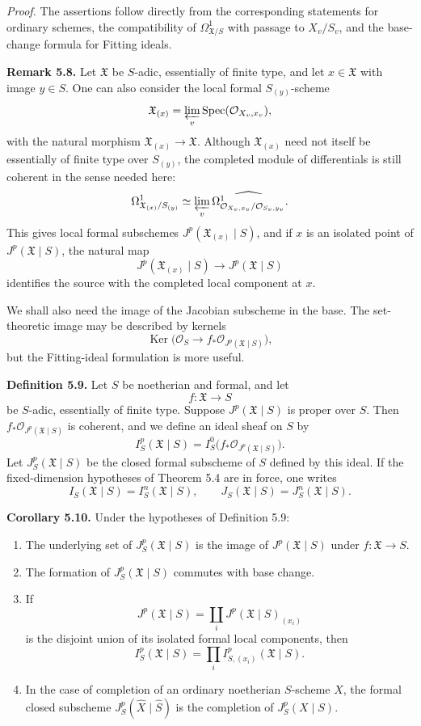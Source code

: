\documentclass[11pt]{article}
\providecommand{\Spec}{\operatorname{Spec}}
\providecommand{\Ker}{\operatorname{Ker}}
\providecommand{\Oo}{\mathcal O}
\begin{document}
\emph{Proof.}  The assertions follow directly from the corresponding statements for ordinary schemes, the compatibility of \(\Omega^1_{\mathfrak X/S}\) with passage to \(X_v/S_v\), and the base-change formula for Fitting ideals.

\textbf{Remark 5.8.}  Let \(\mathfrak X\) be \(S\)-adic, essentially of finite type, and let \(x\in\mathfrak X\) with image \(y\in S\).  One can also consider the local formal \(S_{(y)}\)-scheme
\[
        \mathfrak X_{(x)}=\varprojlim_v \Spec(\Oo_{X_v,x_v}),
\]
with the natural morphism \(\mathfrak X_{(x)}\to\mathfrak X\).  Although \(\mathfrak X_{(x)}\) need not itself be essentially of finite type over \(S_{(y)}\), the completed module of differentials is still coherent in the sense needed here:
\[
        \Omega^1_{\mathfrak X_{(x)}/S_{(y)}}
        \simeq
        \varprojlim_v \widehat{\Omega^1_{\Oo_{X_v,x_v}/\Oo_{S_v,y_v}}}.
\]
This gives local formal subschemes \(J^p(\mathfrak X_{(x)}\mid S)\), and if \(x\) is an isolated point of \(J^p(\mathfrak X\mid S)\), the natural map
\[
        J^p(\mathfrak X_{(x)}\mid S)\longrightarrow J^p(\mathfrak X\mid S)
\]
identifies the source with the completed local component at \(x\).

We shall also need the image of the Jacobian subscheme in the base.  The set-theoretic image may be described by kernels
\[
        \Ker\bigl(\Oo_S\to f_*\Oo_{J^p(\mathfrak X\mid S)}\bigr),
\]
but the Fitting-ideal formulation is more useful.

\textbf{Definition 5.9.}  Let \(S\) be noetherian and formal, and let
\[
        f:\mathfrak X\longrightarrow S
\]
be \(S\)-adic, essentially of finite type.  Suppose \(J^p(\mathfrak X\mid S)\) is proper over \(S\).  Then \(f_*\Oo_{J^p(\mathfrak X\mid S)}\) is coherent, and we define an ideal sheaf on \(S\) by
\[
        I^p_S(\mathfrak X\mid S)
        =
        I^0_S\bigl(f_*\Oo_{J^p(\mathfrak X\mid S)}\bigr).
\]
Let \(J^p_S(\mathfrak X\mid S)\) be the closed formal subscheme of \(S\) defined by this ideal.  If the fixed-dimension hypotheses of Theorem 5.4 are in force, one writes
\[
        I_S(\mathfrak X\mid S)=I^n_S(\mathfrak X\mid S),
        \qquad
        J_S(\mathfrak X\mid S)=J^n_S(\mathfrak X\mid S).
\]

\textbf{Corollary 5.10.}  Under the hypotheses of Definition 5.9:
\begin{enumerate}[label=(\arabic*)]
\item The underlying set of \(J^p_S(\mathfrak X\mid S)\) is the image of \(J^p(\mathfrak X\mid S)\) under \(f:\mathfrak X\to S\).
\item The formation of \(J^p_S(\mathfrak X\mid S)\) commutes with base change.
\item If
\[
        J^p(\mathfrak X\mid S)=\coprod_i J^p(\mathfrak X\mid S)_{(x_i)}
\]
is the disjoint union of its isolated formal local components, then
\[
        I^p_S(\mathfrak X\mid S)
        =
        \prod_i I^p_{S,(x_i)}(\mathfrak X\mid S).
\]
\item In the case of completion of an ordinary noetherian \(S\)-scheme \(X\), the formal closed subscheme \(J^p_S(\widehat X\mid \widehat S)\) is the completion of \(J^p_S(X\mid S)\).
\end{enumerate}
\end{document}
